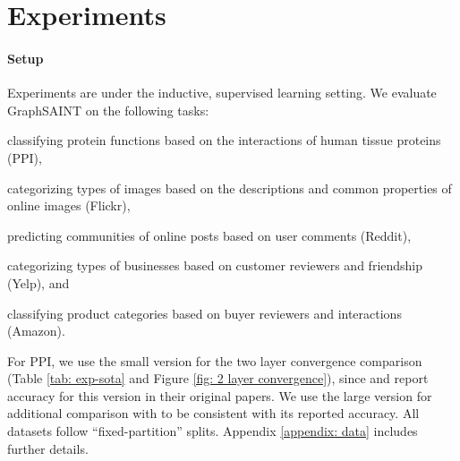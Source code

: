 \documentclass{article} \usepackage{iclr2020_conference,times}
\newcommand{\graphsaint}{{\fontfamily{lmtt}\selectfont GraphSAINT}}
\begin{document}
 \section{Experiments}


\paragraph{Setup} 
Experiments are under the inductive, supervised learning setting. 
We evaluate {\graphsaint} on the following tasks:
\begin{enumerate*}
    \item classifying protein functions based on the interactions of human tissue proteins (PPI),
    \item categorizing types of images based on the descriptions and common properties of online images (Flickr),
    \item predicting communities of online posts based on user comments (Reddit),
    \item categorizing types of businesses based on customer reviewers and friendship (Yelp), and 
    \item classifying product categories based on buyer reviewers and interactions (Amazon).
\end{enumerate*}
For PPI, we use the small version for the two layer convergence comparison (Table \ref{tab: exp-sota} and Figure \ref{fig: 2 layer convergence}), since \cite{graphsage} and \cite{s-gcn} report accuracy for this version in their original papers. 
We use the large version for additional comparison with \cite{cluster-gcn} to be consistent with its reported accuracy. 
All datasets follow ``fixed-partition'' splits. Appendix \ref{appendix: data} includes further details.

\begin{table}[!ht]
\caption{Dataset statistics (``m'' stands for \textbf{m}ulti-class classification, and ``s'' for \textbf{s}ingle-class.)}
    \centering
    \\
\label{tab: exp-dataset}
\end{table}
\end{document}
